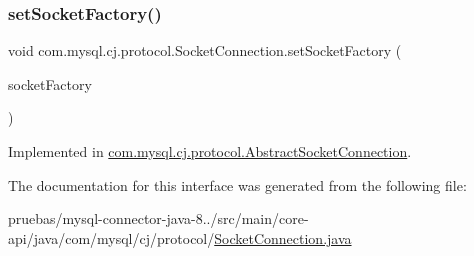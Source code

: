 \mbox{\label{interfacecom_1_1mysql_1_1cj_1_1protocol_1_1_socket_connection_af9beff82797b546cca32590719ad2d15}} 
\subsubsection{\texorpdfstring{set\+Socket\+Factory()}{setSocketFactory()}}
{\footnotesize\ttfamily void com.\+mysql.\+cj.\+protocol.\+Socket\+Connection.\+set\+Socket\+Factory (\begin{DoxyParamCaption}\item[{\mbox{\hyperlink{interfacecom_1_1mysql_1_1cj_1_1protocol_1_1_socket_factory}{Socket\+Factory}}}]{socket\+Factory }\end{DoxyParamCaption})}



Implemented in \mbox{\hyperlink{classcom_1_1mysql_1_1cj_1_1protocol_1_1_abstract_socket_connection_a33c399d3a62154183561e8807bf4dcc5}{com.\+mysql.\+cj.\+protocol.\+Abstract\+Socket\+Connection}}.



The documentation for this interface was generated from the following file\+:\begin{DoxyCompactItemize}
\item 
pruebas/mysql-\/connector-\/java-\/8../src/main/core-\/api/java/com/mysql/cj/protocol/\mbox{\hyperlink{_socket_connection_8java}{Socket\+Connection.\+java}}\end{DoxyCompactItemize}
